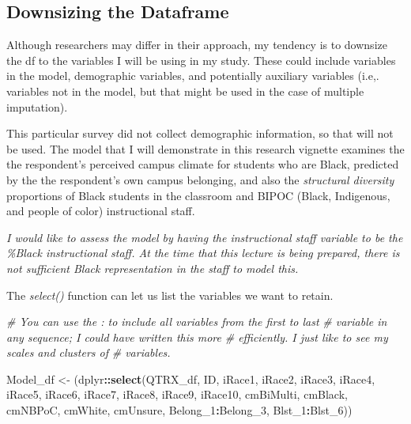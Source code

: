 \documentclass[
  11pt,
]{book}
\newenvironment{Shaded}{\begin{snugshade}}{\end{snugshade}}
\newcommand{\CommentTok}[1]{\textcolor[rgb]{0.37,0.37,0.37}{\textit{#1}}}
\newcommand{\FunctionTok}[1]{\textcolor[rgb]{0.27,0.27,0.27}{\textbf{#1}}}
\newcommand{\NormalTok}[1]{#1}
\newcommand{\OtherTok}[1]{\textcolor[rgb]{0.37,0.37,0.37}{#1}}
\newcommand{\SpecialCharTok}[1]{\textcolor[rgb]{0.43,0.43,0.43}{\textbf{#1}}}
\begin{document}
\hypertarget{downsizing-the-dataframe}{%
\subsection{Downsizing the Dataframe}\label{downsizing-the-dataframe}}

Although researchers may differ in their approach, my tendency is to downsize the df to the variables I will be using in my study. These could include variables in the model, demographic variables, and potentially auxiliary variables (i.e,. variables not in the model, but that might be used in the case of multiple imputation).

This particular survey did not collect demographic information, so that will not be used. The model that I will demonstrate in this research vignette examines the the respondent's perceived campus climate for students who are Black, predicted by the the respondent's own campus belonging, and also the \emph{structural diversity} \citep{lewis_black_2019} proportions of Black students in the classroom and BIPOC (Black, Indigenous, and people of color) instructional staff.

\emph{I would like to assess the model by having the instructional staff variable to be the \%Black instructional staff. At the time that this lecture is being prepared, there is not sufficient Black representation in the staff to model this.}

The \emph{select()} function can let us list the variables we want to retain.

\begin{Shaded}
\begin{Highlighting}[]
\CommentTok{\# You can use the \textquotesingle{}:\textquotesingle{} to include all variables from the first to last}
\CommentTok{\# variable in any sequence; I could have written this more}
\CommentTok{\# efficiently.  I just like to \textquotesingle{}see\textquotesingle{} my scales and clusters of}
\CommentTok{\# variables.}

\NormalTok{Model\_df }\OtherTok{\textless{}{-}}\NormalTok{ (dplyr}\SpecialCharTok{::}\FunctionTok{select}\NormalTok{(QTRX\_df, ID, iRace1, iRace2, iRace3, iRace4,}
\NormalTok{    iRace5, iRace6, iRace7, iRace8, iRace9, iRace10, cmBiMulti, cmBlack,}
\NormalTok{    cmNBPoC, cmWhite, cmUnsure, Belong\_1}\SpecialCharTok{:}\NormalTok{Belong\_3, Blst\_1}\SpecialCharTok{:}\NormalTok{Blst\_6))}
\end{Highlighting}
\end{Shaded}
\end{document}
